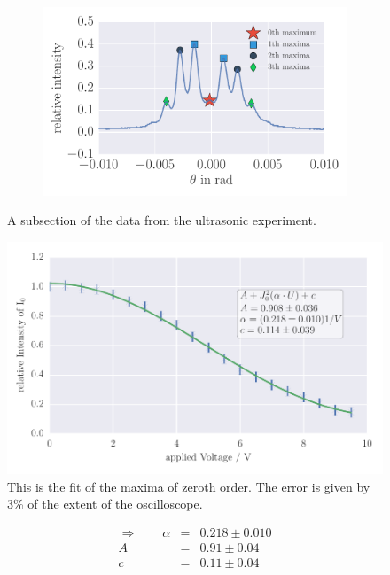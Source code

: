 \begin{figure}
\begin{subfigure}[b]{\picwidth}
        \caption{}
        \label{fig:raman_014}
    \end{subfigure}
    \begin{subfigure}[b]{\picwidth}
        \includegraphics[width=1.0\textwidth]{analysis/figures/raman_020}
        \caption{}
        \label{fig:raman_020}
    \end{subfigure}
    \caption{A subsection of the data from the ultrasonic experiment.}\label{fig:raman}
\end{figure}
\begin{figure}[htpb]
    \centering
    \includegraphics[width=1\textwidth]{analysis/figures/besselfit_0}
    \caption{This is the fit of the maxima of zeroth order. The error is given by 3\% of the extent of the oscilloscope.}
    \label{fig:besselfit_0}
\end{figure}


\begin{align}\Rightarrow \qquad
    \alpha &=& 0.218 \pm 0.010 \\
    A &=& 0.91 \pm 0.04 \\
    c &=& 0.11 \pm 0.04 
\end{align}


